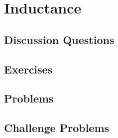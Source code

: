 
\chapter{Inductance}

\section{Discussion Questions}

\section{Exercises}

\section{Problems}

\section{Challenge Problems}
